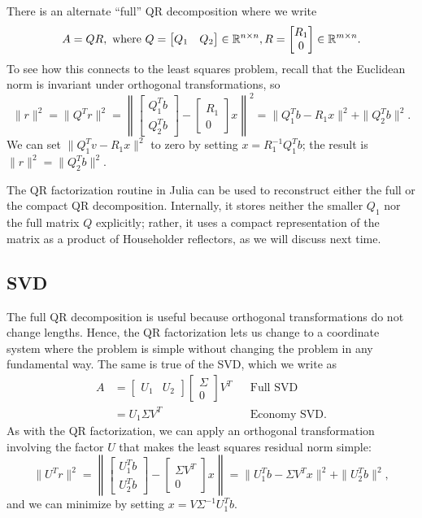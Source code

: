 \documentclass[12pt, leqno]{article} %
\begin{document}
There is an alternate ``full'' QR decomposition where we write
\[
A = QR, \mbox{ where }
Q = \begin{bmatrix} Q_1 & Q_2 \end{bmatrix} \in \mathbb{R}^{n \times n},
R = \begin{bmatrix} R_{1} \\ 0 \end{bmatrix} \in \mathbb{R}^{m \times n}.
\]
To see how this connects to the least squares problem, recall
that the Euclidean norm is invariant under orthogonal transformations,
so
\[
  \|r\|^2 = \|Q^T r\|^2 = \left\| \begin{bmatrix} Q_1^T b \\ Q_2^T
    b \end{bmatrix} - \begin{bmatrix} R_1 \\ 0 \end{bmatrix} x
  \right\|^2 = \|Q_1^T b-R_1x\|^2 + \|Q_2^T b\|^2.
\]
We can set $\|Q_1^T v-R_1 x\|^2$ to zero by
setting $x = R_1^{-1} Q_1^T b$; the result is
$\|r\|^2 = \|Q_2^T b\|^2$.

The QR factorization routine in Julia can be used to reconstruct
either the full or the compact QR decomposition.  Internally, it
stores neither the smaller $Q_1$ nor the full matrix $Q$ explicitly;
rather, it uses a compact representation of the matrix as a product of
Householder reflectors, as we will discuss next time.

\subsection{SVD}

The full QR decomposition is useful because orthogonal transformations
do not change lengths.  Hence, the QR factorization lets us change
to a coordinate system where the problem is simple without changing
the problem in any fundamental way.  The same is true of the SVD,
which we write as
\begin{align*}
A &=
\begin{bmatrix} U_1 & U_2 \end{bmatrix}
\begin{bmatrix} \Sigma \\ 0 \end{bmatrix}
V^T & & \mbox{Full SVD} \\
&= U_1 \Sigma V^T & & \mbox{Economy SVD}.
\end{align*}
As with the QR factorization, we can apply an orthogonal
transformation involving the factor $U$ that makes the
least squares residual norm simple:
\[
\|U^T r\|^2 =
\left\| \begin{bmatrix} U_1^T b \\ U_2^T b \end{bmatrix} -
\begin{bmatrix} \Sigma V^T \\ 0 \end{bmatrix} x
\right\| =
\|U_1^T b - \Sigma V^T x\|^2 + \|U_2^T b\|^2,
\]
and we can minimize by setting $x = V \Sigma^{-1} U_1^T b$.
\end{document}

